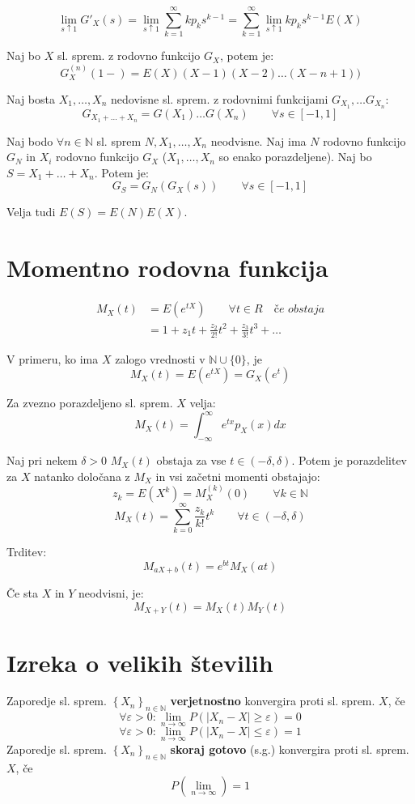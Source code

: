 \begin{multicols}{5}
\[ \lim_{s \uparrow 1} G'_X(s) = \lim_{s \uparrow 1} \sum_{k=1}^\infty k p_k s^{k-1} =  \sum_{k=1}^\infty  \lim_{s \uparrow 1} k p_k s^{k-1}  E(X)\]

Naj bo $X$ sl. sprem. z rodovno funkcijo $G_X$, potem je:
\[ G_X^{(n)}(1-) = E(X)(X-1)(X-2)\dots (X-n+1))\]

Naj bosta $X_1, \dots , X_n$ nedovisne sl. sprem. z rodovnimi funkcijami $G_{X_1}, \dots G_{X_n}$:
\[ G_{X_1+\dots + X_n} = G(X_1) \dots G(X_n) \qquad \forall s \in [-1, 1]\]


Naj bodo $\forall n \in \mathbb{N}$ sl. sprem $N, X_1, \dots, X_n$ neodvisne. Naj ima $N$ rodovno funkcijo $G_N$ in $X_i$ rodovno funkcijo $G_X$ ($X_1, \dots, X_n$ so enako porazdeljene).
Naj bo $S = X_1 +  \dots + X_n$. Potem je:
\[ G_S = G_N(G_X(s)) \qquad \forall s \in [-1, 1]\]

Velja tudi $E(S) = E(N)E(X)$.

\section{Momentno rodovna funkcija}
\begin{align*}
	M_X(t) &= E(e^{tX}) \qquad \forall t \in R \quad \textit{če obstaja} \\
	&= 1 + z_1t + \frac{z_2}{2!} t^2 + \frac{z_3}{3!} t^3 + \dots 
\end{align*} 

V primeru, ko ima $X$ zalogo vrednosti v $\mathbb{N} \cup \{0\}$, je 
\[M_X(t) = E(e^{tX}) = G_X(e^t) \]

Za zvezno porazdeljeno sl. sprem. $X$ velja:
\[ M_X(t) = \int_{-\infty}^\infty e^{tx} p_X(x) dx \]


Naj pri nekem $\delta > 0$ $M_X(t)$ obstaja za vse $t \in (-\delta, \delta)$.
Potem je porazdelitev za $X$ natanko določana z $M_X$ in vsi začetni momenti obstajajo:
\[ z_k = E(X^k) = M_X^{(k)}(0) \qquad \forall k \in \mathbb{N}\]
\[ M_X(t) = \sum_{k=0}^\infty \frac{z_k}{k!}t^k \qquad \forall t \in (-\delta, \delta)\] 

Trditev:
\[M_{aX+b}(t) = e^{bt} M_X(at) \]

Če sta $X$ in $Y$ neodvisni, je:
\[ M_{X+Y} (t) = M_X(t) M_Y(t)\]

\section{Izreka o velikih številih}

Zaporedje sl. sprem. $\left\{X_n\right\}_{n\in \mathbb{N}}$ \textbf{verjetnostno} konvergira proti sl. sprem. $X$, če
\[\forall \varepsilon > 0: \lim_{n \to \infty} P(|X_n - X| \geq \varepsilon) = 0\]
\[\forall \varepsilon > 0: \lim_{n \to \infty} P(|X_n - X| \leq \varepsilon) = 1\]
Zaporedje sl. sprem. $\left\{X_n\right\}_{n\in \mathbb{N}}$ \textbf{skoraj gotovo} (s.g.) konvergira proti sl. sprem. $X$, če
\[ P(\lim_{n \to \infty}) = 1 \]


\end{multicols}
